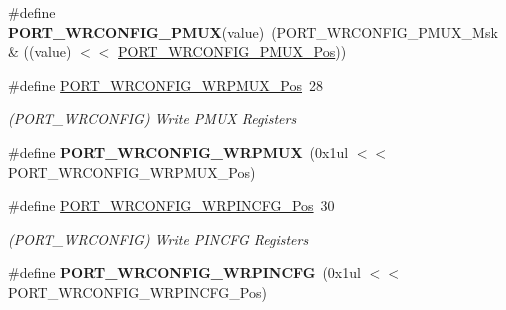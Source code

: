 \begin{DoxyCompactItemize}
\item 
\hypertarget{group___s_a_m_l21___p_o_r_t_ga79d664bf70f1494ebd35f75905b98ca3}{}\#define {\bfseries P\+O\+R\+T\+\_\+\+W\+R\+C\+O\+N\+F\+I\+G\+\_\+\+P\+M\+U\+X}(value)~(P\+O\+R\+T\+\_\+\+W\+R\+C\+O\+N\+F\+I\+G\+\_\+\+P\+M\+U\+X\+\_\+\+Msk \& ((value) $<$$<$ \hyperlink{group___s_a_m_l21___p_o_r_t_gad821493573ea6954861bdb5007458439}{P\+O\+R\+T\+\_\+\+W\+R\+C\+O\+N\+F\+I\+G\+\_\+\+P\+M\+U\+X\+\_\+\+Pos}))\label{group___s_a_m_l21___p_o_r_t_ga79d664bf70f1494ebd35f75905b98ca3}

\item 
\hypertarget{group___s_a_m_l21___p_o_r_t_gaf5c01e870b3cd28ea4b5d16e0970f641}{}\#define \hyperlink{group___s_a_m_l21___p_o_r_t_gaf5c01e870b3cd28ea4b5d16e0970f641}{P\+O\+R\+T\+\_\+\+W\+R\+C\+O\+N\+F\+I\+G\+\_\+\+W\+R\+P\+M\+U\+X\+\_\+\+Pos}~28\label{group___s_a_m_l21___p_o_r_t_gaf5c01e870b3cd28ea4b5d16e0970f641}

\begin{DoxyCompactList}\small\item\em (P\+O\+R\+T\+\_\+\+W\+R\+C\+O\+N\+F\+I\+G) Write P\+M\+U\+X Registers \end{DoxyCompactList}\item 
\hypertarget{group___s_a_m_l21___p_o_r_t_ga41389a6f616a685fbca4a6cbb6e48206}{}\#define {\bfseries P\+O\+R\+T\+\_\+\+W\+R\+C\+O\+N\+F\+I\+G\+\_\+\+W\+R\+P\+M\+U\+X}~(0x1ul $<$$<$ P\+O\+R\+T\+\_\+\+W\+R\+C\+O\+N\+F\+I\+G\+\_\+\+W\+R\+P\+M\+U\+X\+\_\+\+Pos)\label{group___s_a_m_l21___p_o_r_t_ga41389a6f616a685fbca4a6cbb6e48206}

\item 
\hypertarget{group___s_a_m_l21___p_o_r_t_gac9e9a5084c654419e2762a4557fc0fe0}{}\#define \hyperlink{group___s_a_m_l21___p_o_r_t_gac9e9a5084c654419e2762a4557fc0fe0}{P\+O\+R\+T\+\_\+\+W\+R\+C\+O\+N\+F\+I\+G\+\_\+\+W\+R\+P\+I\+N\+C\+F\+G\+\_\+\+Pos}~30\label{group___s_a_m_l21___p_o_r_t_gac9e9a5084c654419e2762a4557fc0fe0}

\begin{DoxyCompactList}\small\item\em (P\+O\+R\+T\+\_\+\+W\+R\+C\+O\+N\+F\+I\+G) Write P\+I\+N\+C\+F\+G Registers \end{DoxyCompactList}\item 
\hypertarget{group___s_a_m_l21___p_o_r_t_gaf100527c943f5f4af1132a46c7d2340f}{}\#define {\bfseries P\+O\+R\+T\+\_\+\+W\+R\+C\+O\+N\+F\+I\+G\+\_\+\+W\+R\+P\+I\+N\+C\+F\+G}~(0x1ul $<$$<$ P\+O\+R\+T\+\_\+\+W\+R\+C\+O\+N\+F\+I\+G\+\_\+\+W\+R\+P\+I\+N\+C\+F\+G\+\_\+\+Pos)\label{group___s_a_m_l21___p_o_r_t_gaf100527c943f5f4af1132a46c7d2340f}


\end{DoxyCompactItemize}

